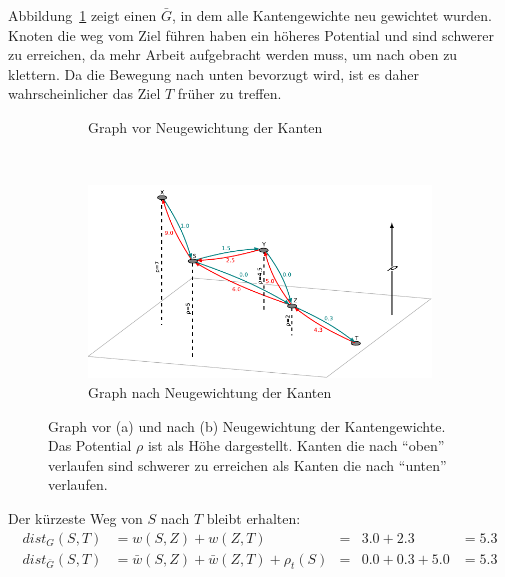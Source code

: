 Abbildung~\ref{fig:astar} zeigt einen $\bar{G}$, in dem alle Kantengewichte neu gewichtet wurden.
Knoten die weg vom Ziel führen haben ein höheres Potential und sind schwerer zu erreichen, da mehr
Arbeit aufgebracht werden muss, um nach oben zu klettern. Da die Bewegung nach unten bevorzugt wird,
ist es daher wahrscheinlicher das Ziel $T$ früher zu treffen.\\
\begin{figure}[h]
    \centering
    \begin{subfigure}[b]{\textwidth}
        \centering
        
        \caption{Graph vor Neugewichtung der Kanten}
    \end{subfigure}
    \\[1em]
    \begin{subfigure}[b]{\textwidth}
        \centering
        \includegraphics{figures/figure_astar_after_pp.pdf}
        \caption{Graph nach Neugewichtung der Kanten}
    \end{subfigure}
    \caption{Graph vor (a) und nach (b) Neugewichtung der Kantengewichte. Das Potential $\rho$ ist
        als Höhe dargestellt. Kanten die nach "`oben"' verlaufen sind schwerer zu erreichen
        als Kanten die nach "`unten"' verlaufen.}
    \label{fig:astar}
\end{figure}

Der kürzeste Weg von $S$ nach $T$ bleibt erhalten:
\begin{align*}
    dist_{G}(S,T)       & = w(S,Z) + w(Z,T)                         & = & 3.0 + 2.3       & = 5.3 \\
    dist_{\bar{G}}(S,T) & = \bar{w}(S,Z) + \bar{w}(Z,T) + \rho_t(S) & = & 0.0 + 0.3 + 5.0 & = 5.3
\end{align*}

